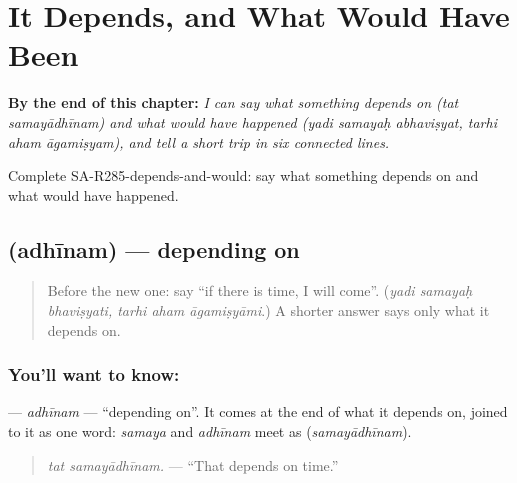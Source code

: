 
\chapter{It Depends, and What Would Have Been}
\label{ch:sa-it-depends-and-what-would-have-been}

\begin{chapteropening}
\textbf{By the end of this chapter:} \emph{I can say what something depends on (tat samayādhīnam) and what would have happened (yadi samayaḥ abhaviṣyat, tarhi aham āgamiṣyam), and tell a short trip in six connected lines.}

Complete SA-R285-depends-and-would: say what something depends on and what would have happened.
\end{chapteropening}

\section[\texorpdfstring{\sk{अधीनम्} (adhīnam)}{अधीनम् (adhīnam)}]{ (adhīnam) — depending on}

\label{lesson:SA-C285-adhinam}



\begin{quote}
Before the new one: say \textquotedblleft{}if there is time, I will come\textquotedblright{}. (\emph{yadi samayaḥ bhaviṣyati, tarhi aham āgamiṣyāmi}.) A shorter answer says only what it depends on.
\end{quote}

\subsection*{You'll want to know: }
\textbf{} — \emph{adhīnam} — \textquotedblleft{}depending on\textquotedblright{}. It comes at the end of what it depends on, joined to it as one word: \emph{samaya} and \emph{adhīnam} meet as \textbf{} (\emph{samayādhīnam}).

\begin{quote}
\textbf{ }
\end{quote}

\begin{quote}
\emph{tat samayādhīnam.} — \textquotedblleft{}That depends on time.\textquotedblright{}
\end{quote}

